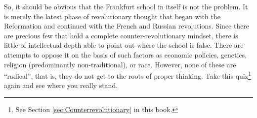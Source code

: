 So, it should be obvious that the Frankfurt school in itself is not the problem. It is merely the latest phase of revolutionary thought that began with the Reformation and continued with the French and Russian revolutions. Since there are precious few that hold a complete counter-revolutionary mindset, there is little of intellectual depth able to point out where the school is false. There are attempts to oppose it on the basis of such factors as economic policies, genetics, religion (predominantly non-traditional), or race. However, none of these are ``radical'', that is, they do not get to the roots of proper thinking. Take this quiz\footnote{See Section \ref{sec:Counterrevolutionary} in this book.} again and see where you really stand.



